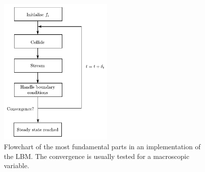 \begin{figure}
\begin{center}
\includegraphics[width=0.5\textwidth]{fig/algorithm.pdf}
\end{center}
\caption{Flowchart of the most fundamental parts in an implementation
  of the LBM. The convergence is usually tested for a macroscopic
  variable.}
\label{fig:lbm:algo}
\end{figure}

